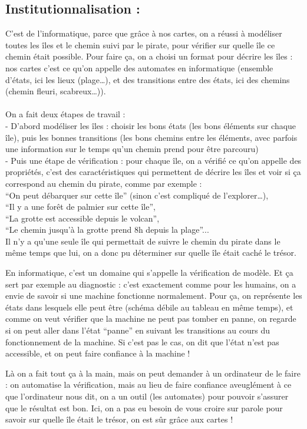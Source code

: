 \documentclass[12pt, a4paper]{article}
\begin{document}
\subsection*{Institutionnalisation :}
C’est de l’informatique, parce que grâce à nos cartes, on a réussi à modéliser toutes les îles et le chemin suivi par le pirate, pour vérifier
sur quelle île ce chemin était possible. Pour faire ça, on a choisi un format pour décrire les îles : nos cartes c’est ce qu’on appelle des
automates en informatique (ensemble d’états, ici les lieux (plage…), et des transitions entre des états, ici des chemins (chemin fleuri, scabreux…)).

\paragraph*{}
On a fait deux étapes de travail : \\
- D’abord modéliser les îles : choisir les bons états (les bons éléments sur chaque île), puis les bonnes transitions (les bons chemins entre
les éléments, avec parfois une information sur le temps qu’un chemin prend pour être parcouru) \\
- Puis une étape de vérification : pour chaque île, on a vérifié ce qu’on appelle des propriétés, c’est des caractéristiques qui permettent de
décrire les îles et voir si ça correspond au chemin du pirate, comme par exemple :
\\
“On peut débarquer sur cette île” (sinon c’est compliqué de l’explorer…), \\
“Il y a une forêt de palmier sur cette île”, \\
“La grotte est accessible depuis le volcan”, \\
“Le chemin jusqu’à la grotte prend 8h depuis la plage”... \\

Il n’y a qu’une seule île qui permettait de suivre le chemin du pirate dans le même temps que lui, on a donc pu déterminer sur quelle île
était caché le trésor.

En informatique, c’est un domaine qui s’appelle la vérification de modèle. Et ça sert par exemple au diagnostic : c’est exactement comme
pour les humains, on a envie de savoir si une machine fonctionne normalement. Pour ça, on représente les états dans lesquels elle peut être
(schéma débile au tableau en même temps), et comme on veut vérifier que la machine ne peut pas tomber en panne, on regarde si on peut aller
dans l’état “panne” en suivant les transitions au cours du fonctionnement de la machine. Si c’est pas le cas, on dit que l’état n’est pas
accessible, et on peut faire confiance à la machine !

Là on a fait tout ça à la main, mais on peut demander à un ordinateur de le faire : on automatise la vérification, mais au lieu de faire
confiance aveuglément à ce que l’ordinateur nous dit, on a un outil (les automates) pour pouvoir s’assurer que le résultat est bon. Ici,
on a pas eu besoin de vous croire sur parole pour savoir sur quelle île était le trésor, on est sûr grâce aux cartes !
\end{document}
